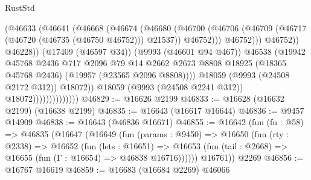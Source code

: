 \begin{lexlean}{RustStd}
\begin{coremodule}
                                            (@46633
                                              (@46641
                                                (@46668
                                                  (@46674
                                                    (@46680
                                                      (@46700
                                                        (@46706
                                                          (@46709
                                                            (@46717
                                                              (@46720 (@46735 (@46750 @46752)))
                                                              @21537))
                                                          @46752)))
                                                    @46752)))
                                              @46752))
                                          @46228))
                                      (@17409 (@46597 @34))
                                      (@9993 (@46601 @94 @467))
                                      @46538
                                      (@19942
                                        @45768
                                        @2436
                                        @717
                                        @2096
                                        @79
                                        @14
                                        @2662
                                        @2673
                                        @8808
                                        @18925
                                        (@18365 @45768 @2436)
                                        (@19957 (@23565 @2096 @8808))))
                                    @18059
                                    (@9993 (@24508 @2172 @312))
                                    @18072))
                                @18059
                                (@9993 (@24508 @2241 @312))
                                @18072))))))))))))))
@46829 := @16626 @2199
@46833 := @16628 (@16632 @2199) (@16638 @2199)
@46835 := @16643 (@16617 @16644)
@46836 := @9457 @14909
@46838 := @16643 (@46836 @16671)
@46855 := @16642
    (fun (fn : @58) =>
    @46835
      (@16647
        (@16649
          (fun (params : @9450) =>
          @16650
            (fun (rty : @2338) =>
            @16652
              (fun (lets : @16651) =>
              @16653 (fun (tail : @2668) => @16655 (fun (Γ : @16654) => @46838 @16716))))))
        @16761))
    @2269
@46856 := @16767 @16619
@46859 := @16683 (@16684 @2269) @46066

\end{coremodule}
\end{lexlean}
